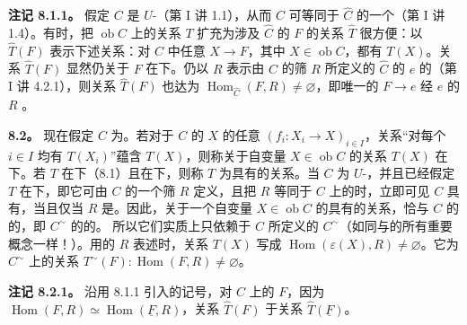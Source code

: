 \textbf{注记 8.1.1。} 假定 $C$ 是 $U$-（第 I 讲 1.1），从而 $C$ 可等同于 $\widehat C$ 的一个（第 I 讲 1.4）。有时，把 $\operatorname{ob}C$ 上的关系 $T$ 扩充为涉及 $\widehat C$ 的 $F$ 的关系 $\widehat T$ 很方便：以 $\widehat T(F)$ 表示下述关系：对 $\widehat C$ 中任意 $X\to F$，其中 $X\in\operatorname{ob}C$，都有 $T(X)$。关系 $\widehat T(F)$ 显然仍关于 $F$ 在下。仍以 $R$ 表示由 $C$ 的筛 $R$ 所定义的 $\widehat C$ 的 $e$ 的（第 I 讲 4.2.1），则关系 $\widehat T(F)$ 也达为 $\operatorname{Hom}_{\widehat C}(F,R)\ne\varnothing$，即唯一的 $F\to e$ 经 $e$ 的 $R$ 。

\textbf{8.2。} 现在假定 $C$ 为。若对于 $C$ 的 $X$ 的任意 $(f_i:X_i\to X)_{i\in I}$，关系“对每个 $i\in I$ 均有 $T(X_i)$”蕴含 $T(X)$，则称关于自变量 $X\in\operatorname{ob}C$ 的关系 $T(X)$ 在下。若 $T$ 在下（8.1）且在下，则称 $T$ 为具有的关系。当 $C$ 为 $U$-，并且已经假定 $T$ 在下，即它可由 $C$ 的一个筛 $R$ 定义，且把 $R$ 等同于 $C$ 上的时，立即可见 $C$ 具有，当且仅当 $R$ 是。因此，关于一个自变量 $X\in\operatorname{ob}C$ 的具有的关系，恰与 $C$ 的的，即 $C^\sim$ 的的。
所以它们实质上只依赖于 $C$ 所定义的 $C^\sim$（如同与的所有重要概念一样！）。用的 $R$ 表述时，关系 $T(X)$ 写成 $\operatorname{Hom}(\varepsilon(X),R)\ne\varnothing$。它为 $C^\sim$ 上的关系 $T^\sim(F):\operatorname{Hom}(F,R)\ne\varnothing$。

\textbf{注记 8.2.1。} 沿用 8.1.1 引入的记号，对 $C$ 上的 $F$，因为 $\operatorname{Hom}(F,R)\simeq\operatorname{Hom}(\underline F,R)$，关系 $\widehat T(F)$ 于关系 $\widehat T(\underline F)$。

